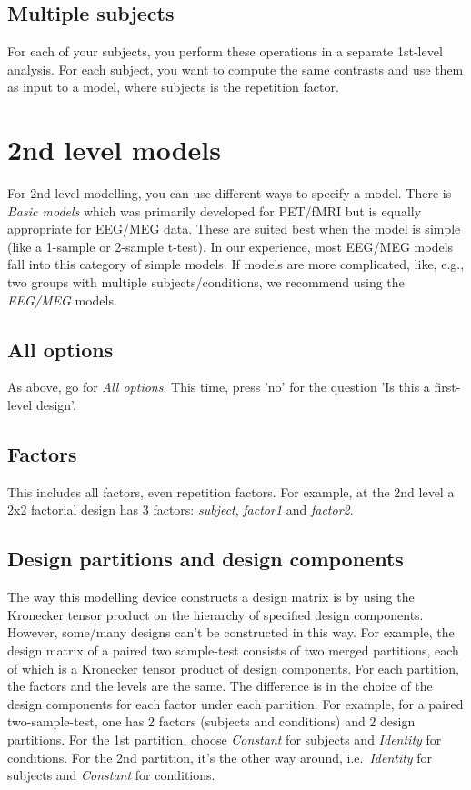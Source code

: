 \subsection{Multiple subjects}
For each of your subjects, you perform these operations in a separate
1st-level analysis. For each subject, you want to compute the same
contrasts and use them as input to a model, where subjects is the
repetition factor. 

\section{2nd level models}
For 2nd level modelling, you can use different ways to specify a
model. There is \textit{Basic models} which was primarily developed for
PET/fMRI but is equally appropriate for EEG/MEG data. These are
suited best when the model is simple (like a 1-sample or 2-sample
t-test). In our experience, most EEG/MEG models fall into this
category of simple models. If models are more complicated, like, e.g.,
two groups with multiple subjects/conditions, we recommend using the
\textit{EEG/MEG} models.

\subsection{All options}
As above, go for \textit{All options}. This time, press 'no' for the
question 'Is this a first-level design'. 

\subsection{Factors}
This includes all factors, even repetition factors. For example, at
the 2nd level a 2x2 factorial design has 3 factors: \textit{subject},
\textit{factor1} and \textit{factor2}.
 
\subsection{Design partitions and design components}
The way this modelling device constructs a design matrix is by using the
Kronecker tensor product on the hierarchy of specified design
components. However, some/many designs can't be constructed in this
way. For example, the design matrix of a paired two sample-test
consists of two merged partitions, each of which is a Kronecker tensor
product of design components. For each partition, the factors and the
levels are the same. The difference is in the choice of the design
components for each factor under each partition. For example, for a
paired two-sample-test, one has 2 factors (subjects and conditions)
and 2 design partitions. For the 1st partition, choose
\textit{Constant} for subjects and \textit{Identity} for
conditions. For the 2nd partition, it's the other way around,
i.e.~\textit{Identity} for subjects and \textit{Constant} for
conditions.

